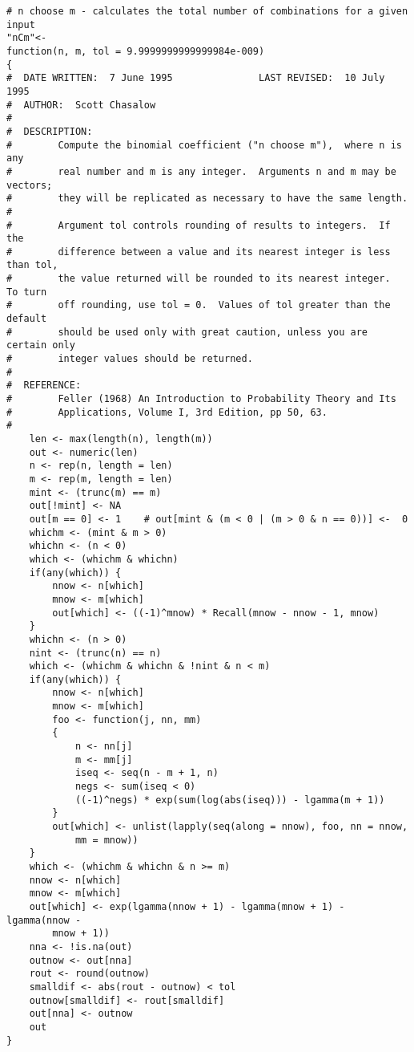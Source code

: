 {\begin{lstlisting}
# n choose m - calculates the total number of combinations for a given input
"nCm"<-
function(n, m, tol = 9.9999999999999984e-009)
{
#  DATE WRITTEN:  7 June 1995               LAST REVISED:  10 July 1995
#  AUTHOR:  Scott Chasalow
#
#  DESCRIPTION: 
#        Compute the binomial coefficient ("n choose m"),  where n is any 
#        real number and m is any integer.  Arguments n and m may be vectors;
#        they will be replicated as necessary to have the same length.
#
#        Argument tol controls rounding of results to integers.  If the
#        difference between a value and its nearest integer is less than tol,  
#        the value returned will be rounded to its nearest integer.  To turn
#        off rounding, use tol = 0.  Values of tol greater than the default
#        should be used only with great caution, unless you are certain only
#        integer values should be returned.
#
#  REFERENCE: 
#        Feller (1968) An Introduction to Probability Theory and Its 
#        Applications, Volume I, 3rd Edition, pp 50, 63.
#
	len <- max(length(n), length(m))
	out <- numeric(len)
	n <- rep(n, length = len)
	m <- rep(m, length = len)
	mint <- (trunc(m) == m)
	out[!mint] <- NA
	out[m == 0] <- 1	# out[mint & (m < 0 | (m > 0 & n == 0))] <-  0
	whichm <- (mint & m > 0)
	whichn <- (n < 0)
	which <- (whichm & whichn)
	if(any(which)) {
		nnow <- n[which]
		mnow <- m[which]
		out[which] <- ((-1)^mnow) * Recall(mnow - nnow - 1, mnow)
	}
	whichn <- (n > 0)
	nint <- (trunc(n) == n)
	which <- (whichm & whichn & !nint & n < m)
	if(any(which)) {
		nnow <- n[which]
		mnow <- m[which]
		foo <- function(j, nn, mm)
		{
			n <- nn[j]
			m <- mm[j]
			iseq <- seq(n - m + 1, n)
			negs <- sum(iseq < 0)
			((-1)^negs) * exp(sum(log(abs(iseq))) - lgamma(m + 1))
		}
		out[which] <- unlist(lapply(seq(along = nnow), foo, nn = nnow, 
			mm = mnow))
	}
	which <- (whichm & whichn & n >= m)
	nnow <- n[which]
	mnow <- m[which]
	out[which] <- exp(lgamma(nnow + 1) - lgamma(mnow + 1) - lgamma(nnow - 
		mnow + 1))
	nna <- !is.na(out)
	outnow <- out[nna]
	rout <- round(outnow)
	smalldif <- abs(rout - outnow) < tol
	outnow[smalldif] <- rout[smalldif]
	out[nna] <- outnow
	out
}
\end{lstlisting}
}

